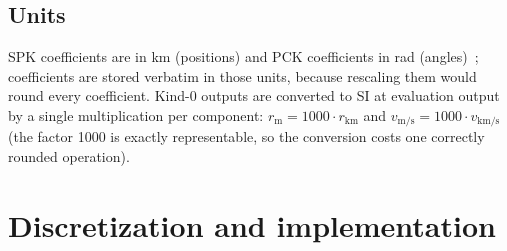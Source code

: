 \subsection{Units}

SPK coefficients are in km (positions) and PCK coefficients in rad
(angles)~\cite{naifspk}; coefficients are stored verbatim in those units,
because rescaling them would round every coefficient. Kind-0 outputs are
converted to SI at evaluation output by a single multiplication per
component: $r_{\mathrm{m}} = 1000 \cdot r_{\mathrm{km}}$ and
$v_{\mathrm{m/s}} = 1000 \cdot v_{\mathrm{km/s}}$ (the factor 1000 is exactly
representable, so the conversion costs one correctly rounded operation).

\section{Discretization and implementation}
\label{sec:ephemeris:implementation}

